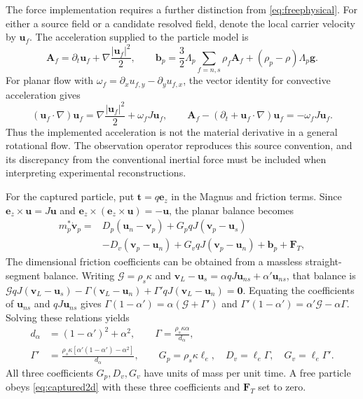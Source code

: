 \documentclass[11pt]{article}
\numberwithin{equation}{section}
\begin{document}
The force implementation requires a further distinction from \eqref{eq:freephysical}. For either a source field or a candidate resolved field, denote the local carrier velocity by $\mathbf u_f$. The acceleration supplied to the particle model is
\begin{equation}
 \mathbf A_f=\partial_t\mathbf u_f+
              \nabla\frac{|\mathbf u_f|^2}{2},
 \qquad
 \mathbf b_p=\frac32\Lambda_p\sum_{f=n,s}\rho_f\mathbf A_f
       +(\rho_p-\rho)\Lambda_p\mathbf g.
 \label{eq:implementedacceleration}
\end{equation}
For planar flow with $\omega_f=\partial_xu_{f,y}-\partial_yu_{f,x}$, the vector identity for convective acceleration gives
\begin{equation}
 (\mathbf u_f\cdot\nabla)\mathbf u_f
 =\nabla\frac{|\mathbf u_f|^2}{2}+\omega_fJ\mathbf u_f,
 \qquad
 \mathbf A_f-(\partial_t+\mathbf u_f\cdot\nabla)\mathbf u_f
 =-\omega_fJ\mathbf u_f.
 \label{eq:accelerationdifference}
\end{equation}
Thus the implemented acceleration is not the material derivative in a general rotational flow. The observation operator reproduces this source convention, and its discrepancy from the conventional inertial force must be included when interpreting experimental reconstructions.

For the captured particle, put $\mathbf t=q\mathbf e_z$ in the Magnus and friction terms. Since $\mathbf e_z\times\mathbf u=J\mathbf u$ and $\mathbf e_z\times(\mathbf e_z\times\mathbf u)=-\mathbf u$, the planar balance becomes
\begin{equation}
 \begin{aligned}
 m_p^*\dot{\mathbf v}_p={}&D_p(\mathbf u_n-\mathbf v_p)
 +G_pqJ(\mathbf v_p-\mathbf u_s)\\
 &-D_v(\mathbf v_p-\mathbf u_n)
 +G_vqJ(\mathbf v_p-\mathbf u_n)+\mathbf b_p+\mathbf F_T,
 \end{aligned}
 \label{eq:captured2d}
\end{equation}
The dimensional friction coefficients can be obtained from a massless straight-segment balance. Writing $\mathcal G=\rho_s\kappa$ and $\mathbf v_L-\mathbf u_s=\alpha qJ\mathbf u_{ns}+\alpha'\mathbf u_{ns}$, that balance is $\mathcal G qJ(\mathbf v_L-\mathbf u_s)-\Gamma(\mathbf v_L-\mathbf u_n)+\Gamma'qJ(\mathbf v_L-\mathbf u_n)=\mathbf0$. Equating the coefficients of $\mathbf u_{ns}$ and $qJ\mathbf u_{ns}$ gives $\Gamma(1-\alpha')=\alpha(\mathcal G+\Gamma')$ and $\Gamma'(1-\alpha')=\alpha'\mathcal G-\alpha\Gamma$. Solving these relations yields
\begin{equation}
 \begin{aligned}
 d_\alpha&=(1-\alpha')^2+\alpha^2,\qquad
 \Gamma=\frac{\rho_s\kappa\alpha}{d_\alpha},\\
 \Gamma'&=\frac{\rho_s\kappa[\alpha'(1-\alpha')-\alpha^2]}{d_\alpha},\qquad
 G_p=\rho_s\kappa\ell_e,\quad D_v=\ell_e\Gamma,\quad G_v=\ell_e\Gamma'.
 \end{aligned}
 \label{eq:frictioncoefficients}
\end{equation}
All three coefficients $G_p,D_v,G_v$ have units of mass per unit time. A free particle obeys \eqref{eq:captured2d} with these three coefficients and $\mathbf F_T$ set to zero.
\end{document}
